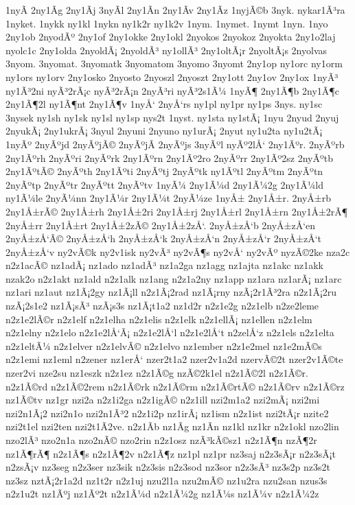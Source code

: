 {1nyÃ­
2ny1Ã­g
2ny1Ã­j
3nyÃ­l
2ny1Ã­n
2ny1Ã­v
2ny1Ã­z
1nyjÃ©b
3nyk.
nykar1Ã³ra
1nyket.
1nykk
ny1kl
1nykn
ny1k2r
ny1k2v
1nym.
1nymet.
1nymt
1nyn.
1nyo
2ny1ob
2nyodÃº
2ny1of
2ny1okke
2ny1okl
2nyokos
2nyokoz
2nyokta
2ny1o2laj
nyolc1c
2ny1olda
2nyoldÃ¡
2nyoldÃ³
ny1ollÃ³
2ny1oltÃ¡r
2nyoltÃ¡s
2nyolvas
3nyom.
3nyomat.
3nyomatk
3nyomatom
3nyomo
3nyomt
2ny1op
ny1orc
ny1orm
ny1ors
ny1orv
2ny1osko
2nyosto
2nyoszl
2nyoszt
2ny1ott
2ny1ov
2ny1ox
1nyÃ³
ny1Ã³2ni
nyÃ³2rÃ¡c
nyÃ³2rÃ¡n
2nyÃ³ri
nyÃ³2s1Ã¼
1nyÃ¶
2ny1Ã¶b
2ny1Ã¶c
2ny1Ã¶2l
ny1Ã¶nt
2ny1Ã¶v
1nyÅ‘
2nyÅ‘rs
ny1pl
ny1pr
ny1ps
3nys.
ny1sc
3nysek
ny1sh
ny1sk
ny1sl
ny1sp
nys2t
1nyst.
ny1sta
ny1stÃ¡
1nyu
2nyud
2nyuj
2nyukÃ¡
2ny1ukrÃ¡
3nyul
2nyuni
2nyuno
ny1urÃ¡
2nyut
ny1u2ta
ny1u2tÃ¡
1nyÃº
2nyÃºjd
2nyÃºjÃ©
2nyÃºjÃ­
2nyÃºjs
3nyÃºl
nyÃº2lÅ‘
2ny1Ãºr.
2nyÃºrb
2ny1Ãºrh
2nyÃºri
2nyÃºrk
2ny1Ãºrn
2ny1Ãº2ro
2nyÃºrr
2ny1Ãº2sz
2nyÃºtb
2ny1ÃºtÃ©
2nyÃºth
2ny1Ãºti
2nyÃºtj
2nyÃºtk
ny1Ãºtl
2nyÃºtm
2nyÃºtn
2nyÃºtp
2nyÃºtr
2nyÃºtt
2nyÃºtv
1nyÃ¼
2ny1Ã¼d
2ny1Ã¼2g
2ny1Ã¼ld
ny1Ã¼le
2nyÃ¼nn
2ny1Ã¼r
2ny1Ã¼t
2nyÃ¼ze
1nyÅ±
2ny1Å±r.
2nyÅ±rb
2ny1Å±rÃ©
2ny1Å±rh
2ny1Å±2ri
2ny1Å±rj
2ny1Å±rl
2ny1Å±rn
2ny1Å±2rÃ¶
2nyÅ±rr
2ny1Å±rt
2ny1Å±2zÃ©
2ny1Å±2zÅ‘.
2nyÅ±zÅ‘b
2nyÅ±zÅ‘en
2nyÅ±zÅ‘Ã©
2nyÅ±zÅ‘h
2nyÅ±zÅ‘k
2nyÅ±zÅ‘n
2nyÅ±zÅ‘r
2nyÅ±zÅ‘t
2nyÅ±zÅ‘v
ny2vÃ©k
ny2v1isk
ny2vÃ³
ny2vÃ¶s
ny2vÅ‘
ny2vÃº
nyzÃ©2ke
nza2c
n2z1acÃ©
nz1adÃ¡
nz1ado
nz1adÃ³
nz1a2ga
nz1agg
nz1ajta
nz1akc
nz1akk
nzak2o
n2z1akt
nz1ald
n2z1alk
nz1ang
n2z1a2ny
nz1app
nz1ara
nz1arÃ¡
nz1arc
nz1ari
nz1aut
nz1Ã¡2gy
nz1Ã¡ll
n2z1Ã¡2rad
nz1Ã¡rny
nzÃ¡2r1Ã³2ra
n2z1Ã¡2ru
nzÃ¡2s1e2
nz1Ã¡sÃ³
nzÃ¡s3s
nz1Ã¡t1a2
nz1d2r
n2z1e2g
n2z1elb
n2ze2leme
n2z1e2lÃ©r
n2z1elf
n2z1elha
n2z1elis
n2z1elk
n2z1ellÃ¡
nz1ellen
n2z1elm
n2z1elny
n2z1elo
n2z1e2lÅ‘Ã¡
n2z1e2lÅ‘l
n2z1e2lÅ‘t
n2zelÅ‘z
n2z1els
n2z1elta
n2z1eltÃ¼
n2z1elver
n2z1elvÃ©
n2z1elvo
nz1ember
n2z1e2mel
nz1e2mÃ©s
n2z1emi
nz1eml
n2zener
nz1erÅ‘
nzer2t1a2
nzer2v1a2d
nzervÃ©2t
nzer2v1Ã©te
nzer2vi
nze2su
nz1eszk
n2z1ez
n2z1Ã©g
nzÃ©2k1el
n2z1Ã©2l
n2z1Ã©r.
n2z1Ã©rd
n2z1Ã©2rem
n2z1Ã©rk
n2z1Ã©rm
n2z1Ã©rtÃ©
n2z1Ã©rv
n2z1Ã©rz
nz1Ã©tv
nz1gr
nzi2a
n2z1i2ga
n2z1igÃ©
n2z1ill
nzi2m1a2
nzi2mÃ¡
nzi2mi
nzi2n1Ã¡2
nzi2n1o
nzi2n1Ã³2
n2z1i2p
nz1irÃ¡
nz1ism
n2z1ist
nzi2tÃ¡r
nzite2
nzi2t1el
nzi2ten
nzi2t1Ã­2ve.
n2z1Ã­b
nz1Ã­g
nz1Ã­n
nz1kl
nz1kr
n2z1okl
nzo2lin
nzo2lÃ³
nzo2n1a
nzo2nÃ©
nzo2rin
n2z1osz
nzÃ³kÃ©sz1
n2z1Ã¶n
nzÃ¶2r
nz1Ã¶rÃ¶
n2z1Ã¶s
n2z1Ã¶2v
n2z1Ã¶z
nz1pl
nz1pr
nz3saj
n2z3sÃ¡r
n2z3sÃ¡t
n2zsÃ¡v
nz3seg
n2z3ser
nz3sik
n2z3sis
n2z3sod
nz3sor
n2z3sÃ³
nz3s2p
nz3s2t
nz3sz
nztÃ¡2r1a2d
nz1t2r
n2z1uj
nzu2l1a
nzu2mÃ©
nz1u2ra
nzu2san
nzus3s
n2z1u2t
nz1Ãºj
nz1Ãº2t
n2z1Ã¼d
n2z1Ã¼2g
nz1Ã¼s
nz1Ã¼v
n2z1Ã¼2z
}
